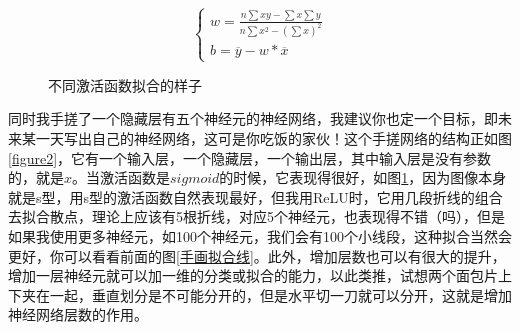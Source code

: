 \documentclass[a5paper, 11pt, openany]{book}
\begin{document}
\begin{equation}
    \begin{cases}
        w = \frac{n\sum{xy}-\sum{x}\sum{y}}{n\sum{x}^2-(\sum{x})^2} \\
        b = \overline{y} - w * \overline{x}
    \end{cases}
    \label{最小二乘法}
\end{equation}

\begin{figure}[ht]
    \centering
    \caption{不同激活函数拟合的样子}
    \label{figure3}
\end{figure}

同时我手搓了一个隐藏层有五个神经元的神经网络，我建议你也定一个目标，即未来某一天写出自己的神经网络，这可是你吃饭的家伙！这个手搓网络的结构正如图\ref{figure2}，它有一个输入层，一个隐藏层，一个输出层，其中输入层是没有参数的，就是$x$。当激活函数是$sigmoid$的时候，它表现得很好，如图\ref{figure3}，因为图像本身就是s型，用s型的激活函数自然表现最好，但我用ReLU时，它用几段折线的组合去拟合散点，理论上应该有5根折线，对应5个神经元，也表现得不错（吗），但是如果我使用更多神经元，如100个神经元，我们会有100个小线段，这种拟合当然会更好，你可以看看前面的图\ref{手画拟合线}。此外，增加层数也可以有很大的提升，增加一层神经元就可以加一维的分类或拟合的能力，以此类推，试想两个面包片上下夹在一起，垂直划分是不可能分开的，但是水平切一刀就可以分开，这就是增加神经网络层数的作用。
\end{document}
